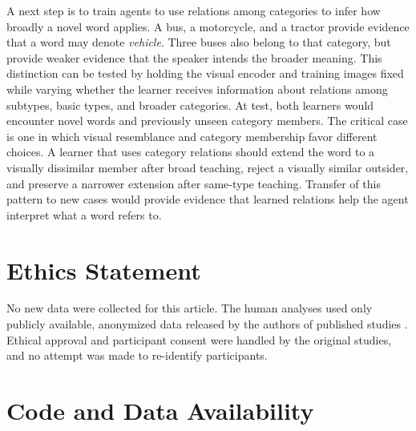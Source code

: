 \documentclass[11pt]{article}
\begin{document}
A next step is to train agents to use relations among categories to infer how broadly a novel word applies. A bus, a motorcycle, and a tractor provide evidence that a word may denote \emph{vehicle}. Three buses also belong to that category, but provide weaker evidence that the speaker intends the broader meaning. This distinction can be tested by holding the visual encoder and training images fixed while varying whether the learner receives information about relations among subtypes, basic types, and broader categories. At test, both learners would encounter novel words and previously unseen category members. The critical case is one in which visual resemblance and category membership favor different choices. A learner that uses category relations should extend the word to a visually dissimilar member after broad teaching, reject a visually similar outsider, and preserve a narrower extension after same-type teaching. Transfer of this pattern to new cases would provide evidence that learned relations help the agent interpret what a word refers to.

\section{Ethics Statement}

No new data were collected for this article. The human analyses used only publicly available, anonymized data released by the authors of published studies \parencite{lewis2018,hebart2023,roads2021,peterson2019,scott2019}. Ethical approval and participant consent were handled by the original studies, and no attempt was made to re-identify participants.

\section{Code and Data Availability}
\end{document}
